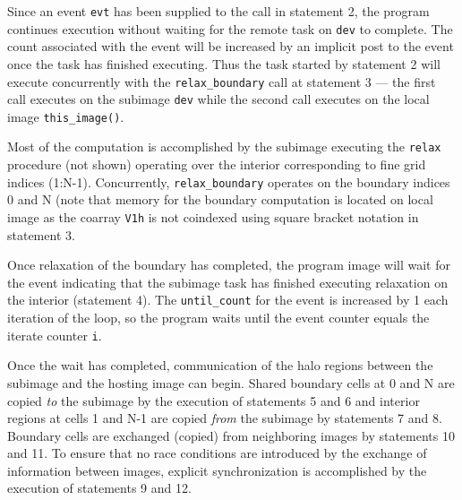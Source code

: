 Since an event \texttt{evt} has been supplied to the call in statement 2, the program
continues execution without waiting for the remote task on \texttt{dev} to complete.  The
count associated with the event will be increased by an implicit post to the event once
the task has finished executing.  Thus the task started by statement 2 will execute
concurrently with the \texttt{relax\_boundary} call at statement 3 --- the first call
executes on the subimage \texttt{dev} while the second call executes on the local image
\texttt{this\_image()}.

Most of the computation is accomplished by the subimage executing the \texttt{relax}
procedure (not shown) operating over the interior corresponding to fine grid indices (1:N-1).
Concurrently, \texttt{relax\_boundary} operates on the boundary indices 0 and N
(note that memory for the boundary computation is located on local image as
the coarray \texttt{V1h} is not coindexed using square bracket notation in statement 3.

Once relaxation of the boundary has completed, the program image will wait for the event
indicating that the subimage task has finished executing relaxation on the interior (statement
4).  The \texttt{until\_count} for the event is increased by 1 each iteration of the loop,
so the program waits until the event counter equals the iterate counter \texttt{i}.

Once the wait has completed, communication of the halo regions between the subimage and
the hosting image can begin.  Shared boundary cells at 0 and N are copied \emph{to} the
subimage by the execution of statements 5 and 6 and interior regions at cells 1 and N-1 are
copied \emph{from} the subimage by statements 7 and 8.  Boundary cells are exchanged (copied)
from neighboring images by statements 10 and 11.  To ensure that no race conditions are
introduced by the exchange of information between images, explicit synchronization is
accomplished by the execution of statements 9 and 12.

